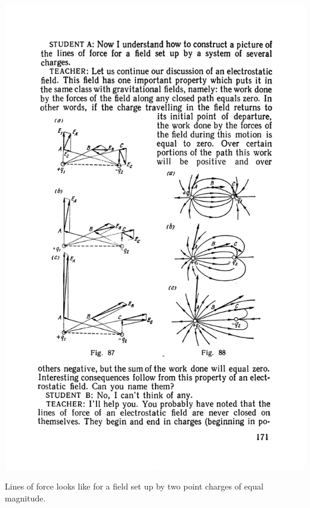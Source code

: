 \documentclass[a4paper,sfsidenotes]{tufte-book}
\begin{document}
\begin{marginfigure}%
\centering
\includegraphics[width=\linewidth]{fig-087a}
\caption{Lines of force looks like for a field set up by two point charges of equal magnitude.}
\label{fig-87}
\end{marginfigure}
\end{document}
